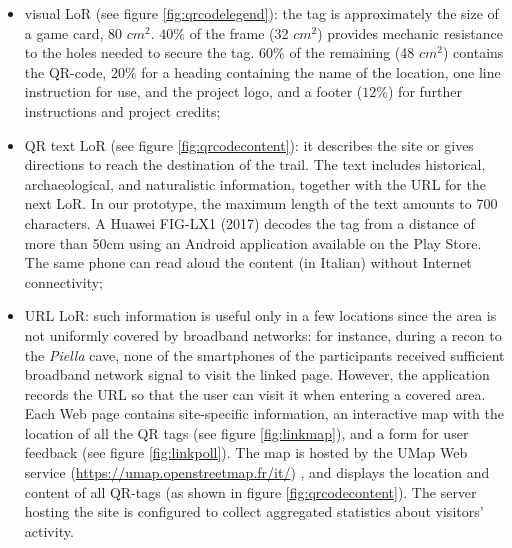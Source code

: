 \documentclass[sustainability,article,submit,pdftex,moreauthors]{Definitions/mdpi}
\begin{document}
\begin{itemize}
    \item visual LoR (see figure \ref{fig:qrcodelegend}): the tag is approximately the size of a game card, 80 $cm^2$. $40\%$ of the frame (32 $cm^2$) provides mechanic resistance to the holes needed to secure the tag. $60\%$ of the remaining (48 $cm^2$) contains the QR-code, $20\%$ for a heading containing the name of the location, one line instruction for use, and the project logo, and a footer ($12\%$) for further instructions and project credits;
    
    \item QR text LoR (see figure \ref{fig:qrcodecontent}): it describes the site or gives directions to reach the destination of the trail. The text includes historical, archaeological, and naturalistic information, together with the URL for the next LoR. In our prototype, the maximum length of the text amounts to 700 characters. A Huawei FIG-LX1 (2017) decodes the tag from a distance of more than 50cm using an Android application available on the Play Store. The same phone can read aloud the content (in Italian) without Internet connectivity;

    \item URL LoR: such information is useful only in a few locations since the area is not uniformly covered by broadband networks: for instance, during a recon to the {\em Piella} cave, none of the smartphones of the participants received sufficient broadband network signal to visit the linked page. However, the application records the URL so that the user can visit it when entering a covered area. Each Web page contains site-specific information, an interactive map with the location of all the QR tags (see figure \ref{fig:linkmap}), and a form for user feedback (see figure \ref{fig:linkpoll}). The map is hosted by the UMap Web service (\url{https://umap.openstreetmap.fr/it/}) , and displays the location and content of all QR-tags (as shown in figure \ref{fig:qrcodecontent}). The server hosting the site is configured to collect aggregated statistics about visitors' activity.
\end{itemize}
\end{document}
